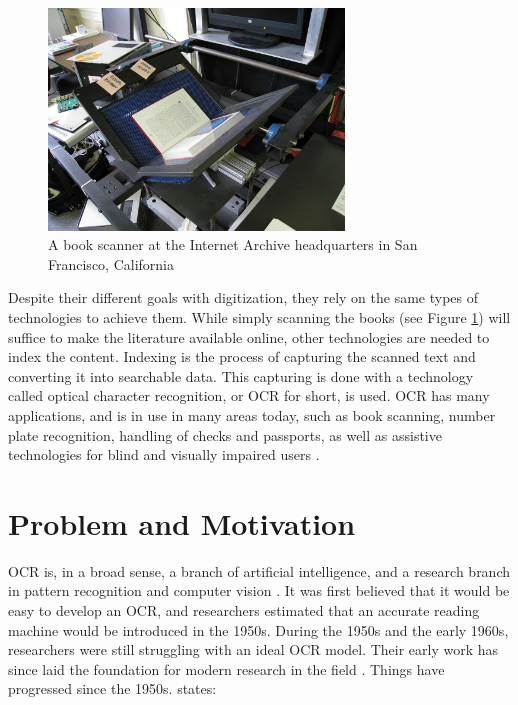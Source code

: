 \begin{figure}[ht]
    \centering
    \includegraphics[width=0.7\textwidth]{fig/chapter1/Internet_Archive_book_scanner_1.jpg}
    \captionsetup{justification=centering}
    \caption{A book scanner at the Internet Archive headquarters in San Francisco, California}
    \label{ref:book_scanner}
\end{figure}

Despite their different goals with digitization, they rely on the same types of technologies to achieve them. While simply scanning the books (see Figure \ref{ref:book_scanner}) will suffice to make the literature available online, other technologies are needed to index the content. Indexing is the process of capturing the scanned text and converting it into searchable data. This capturing is done with a technology called optical character recognition, or OCR for short, is used. OCR has many applications, and is in use in many areas today, such as book scanning, number plate recognition, handling of checks and passports, as well as assistive technologies for blind and visually impaired users \citep{mori1999optical, kurzweil2000reading}.


\section{Problem and Motivation}
\label{sec:problem_motivation}
OCR is, in a broad sense, a branch of artificial intelligence, and a research branch in pattern recognition and computer vision \citep{mori1999optical}. It was first believed that it would be easy to develop an OCR, and researchers estimated that an accurate reading machine would be introduced in the 1950s. During the 1950s and the early 1960s, researchers were still struggling with an ideal OCR model. Their early work has since laid the foundation for modern research in the field \citep{mori1992historical}. Things have progressed since the 1950s. \cite{ye2015text} states:

